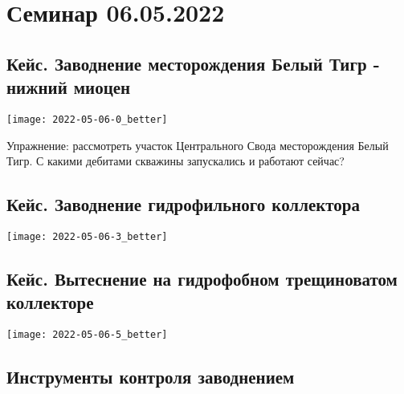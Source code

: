 \documentclass[main.tex]{subfiles}
\begin{document}
\section{Семинар 06.05.2022}

\subsection{Кейс. Заводнение месторождения Белый Тигр - нижний миоцен}

\texttt{[image: 2022-05-06-0\_better]}



Упражнение: рассмотреть участок Центрального Свода месторождения Белый Тигр. С какими дебитами скважины запускались и работают сейчас?

\subsection{Кейс. Заводнение гидрофильного коллектора}

\texttt{[image: 2022-05-06-3\_better]}


\subsection{Кейс. Вытеснение на гидрофобном трещиноватом коллекторе}

\texttt{[image: 2022-05-06-5\_better]}








\subsection{Инструменты контроля заводнением}
\end{document}
